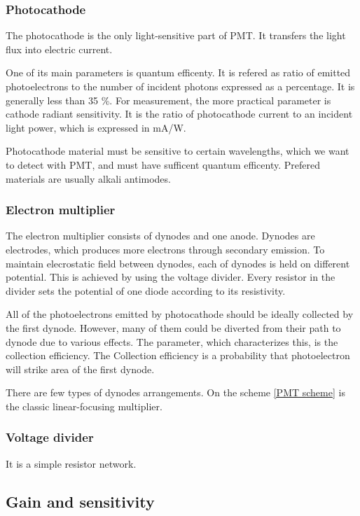 \subsubsection{Photocathode}

The photocathode is the only light-sensitive part of PMT. It transfers the light flux into electric current.
\par
One of its main parameters is quantum efficenty. It is refered as ratio of emitted photoelectrons to the number of incident photons expressed as a percentage. It is generally less than 35 \%. For measurement, the more practical parameter is cathode radiant sensitivity. It is the ratio of photocathode current to an incident light power, which is expressed in mA/W.
\par
Photocathode material must be sensitive to certain wavelengths, which we want to detect with PMT, and must have sufficent quantum efficenty. Prefered materials are usually alkali antimodes.
\subsubsection{Electron multiplier}
The electron multiplier consists of dynodes and one anode.
Dynodes are electrodes, which produces more electrons through secondary emission. To maintain elecrostatic field between dynodes, each of dynodes is held on different potential. This is achieved by using the voltage divider. Every resistor in the divider sets the potential of one diode according to its resistivity.
\par
All of the photoelectrons emitted by photocathode should be ideally collected by the first dynode. However, many of them could be diverted from their path to dynode due to various effects. The parameter, which characterizes this, is the collection efficiency. The Collection efficiency is a probability that photoelectron will strike area of the first dynode. 
\par
There are few types of dynodes arrangements. On the scheme \ref{PMT scheme} is the classic linear-focusing multiplier. 


\subsubsection{Voltage divider}
It is a simple resistor network.  
 


\subsection{Gain and sensitivity}

